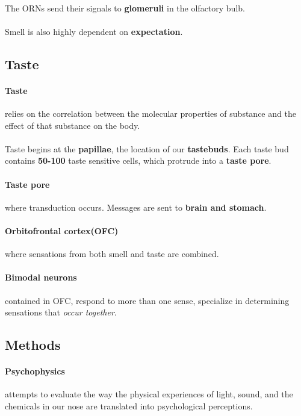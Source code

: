 \documentclass{article}
\begin{document}
	\paragraph{} The ORNs send their signals to \textbf{glomeruli} in the olfactory bulb.
	\paragraph{} Smell is also highly dependent on \textbf{expectation}.
	\subsection{Taste}
	\paragraph{Taste} relies on the correlation between the molecular properties of substance and the effect of that substance on the body.
	\paragraph{} Taste begins at the \textbf{papillae}, the location of our \textbf{tastebuds}. Each taste bud contains \textbf{50-100} taste sensitive cells, which protrude into a \textbf{taste pore}.
	\paragraph{Taste pore} where transduction occurs. Messages are sent to \textbf{brain and stomach}.
	\paragraph{Orbitofrontal cortex(OFC)} where sensations from both smell and taste are combined.
	\paragraph{Bimodal neurons} contained in OFC, respond to more than one sense, specialize in determining sensations that \emph{occur together}.
	\subsection{Methods}
	\paragraph{Psychophysics} attempts to evaluate the way the physical experiences of light, sound, and the chemicals in our nose are translated into psychological perceptions.
\end{document}

